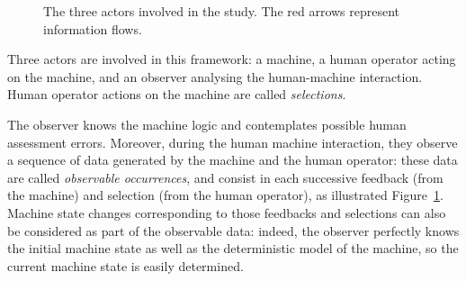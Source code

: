 \begin{figure}
\centering
{}
\caption[Relation between actors involved in the Human-Machine Interation study]{The three actors involved in the study. The red arrows represent information flows.}
 \label{Observer}
\end{figure}

Three actors are involved in this framework: a machine, 
a human operator acting on the machine, 
and an observer analysing the human-machine interaction.
Human operator actions on the machine are called \textit{selections}.

The observer knows the machine logic and contemplates possible human 
assessment errors. Moreover, during the human machine interaction, 
they observe a sequence of data generated by the machine and the human operator: 
these data are called \textit{observable occurrences}, and consist 
in each successive feedback (from the machine) and selection 
(from the human operator), as illustrated Figure~\ref{Observer}. 
Machine state changes corresponding to those feedbacks and 
selections can also be considered as part of the observable data: 
indeed, the observer perfectly knows the initial machine state as well 
as the deterministic model of the machine, so the current machine state 
is easily determined.


